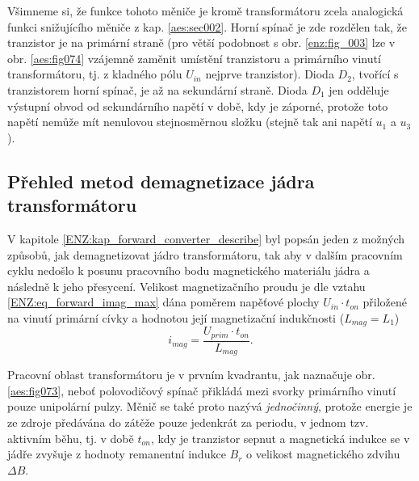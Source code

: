     \begin{tcnote}
      Všimneme si, že funkce tohoto měniče je kromě transformátoru zcela analogická funkci
      snižujícího měniče z kap. \ref{aes:sec002}. Horní spínač je zde rozdělen tak, že tranzistor je
      na primární straně (pro větší podobnost s obr. \ref{enz:fig_003} lze v obr.
      \ref{aes:fig074} vzájemně zaměnit umístění tranzistoru a primárního vinutí
      transformátoru, tj. z kladného pólu $U_{in}$ nejprve tranzistor). Dioda $D_2$, tvořící s
      tranzistorem horní spínač, je až na sekundární straně. Dioda $D_1$ jen odděluje výstupní obvod
      od sekundárního napětí v době, kdy je záporné, protože  toto napětí nemůže mít nenulovou
      stejnosměrnou složku (stejně tak ani napětí $u_1$ a $u_3$).
    \end{tcnote}

  \subsection{Přehled metod demagnetizace jádra transformátoru}


    V kapitole \ref{ENZ:kap_forward_converter_describe} byl popsán jeden z možných způsobů, jak
    demagnetizovat jádro transformátoru, tak aby v dalším pracovním cyklu nedošlo k posunu
    pracovního bodu magnetického materiálu jádra a následně k jeho přesycení. Velikost
    magnetizačního proudu je dle vztahu \ref{ENZ:eq_forward_imag_max} dána poměrem napěťové plochy
    $U_{in}\cdot t_{on}$ přiložené na vinutí primární cívky a hodnotou její magnetizační indukčnosti
    ($L_{mag} = L_{1}$) 
    \begin{equation}
       i_{mag} = \frac{U_{prim}\cdot{t_{on}}}{L_{mag}}.
    \end{equation}
    
    Pracovní oblast transformátoru je v prvním kvadrantu, jak naznačuje obr. \ref{aes:fig073}, neboť
    polovodičový spínač přikládá mezi svorky primárního vinutí pouze unipolární pulzy. Měnič se také
    proto nazývá \emph{jednočinný}, protože energie je ze zdroje předávána do zátěže pouze jedenkrát
    za periodu, v jednom tzv. aktivním běhu, tj. v době $t_{on}$, kdy je tranzistor sepnut a
    magnetická indukce se v jádře zvyšuje z hodnoty remanentní indukce $B_r$ o velikost magnetického
    zdvihu $\Delta B$.
    
